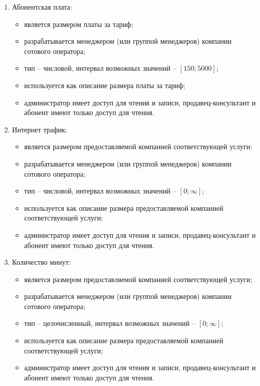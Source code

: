 \begin{enumerate}
\begin{enumerate}
        \item Абонентская плата:
        \begin{itemize}
            \item является размером платы за тариф;
            \item разрабатывается менеджером (или группой менеджеров) компании сотового оператора;
            \item тип -- числовой, интервал возможных значений -- $[150; 5000]$;
            \item используется как описание размера платы за тариф;
            \item администратор имеет доступ для чтения и записи, продавец-консультант и абонент имеют только доступ для чтения.
        \end{itemize}

        \item Интернет трафик:
        \begin{itemize}
            \item является размером предоставляемой компанией соответствующей услуги;
            \item разрабатывается менеджером (или группой менеджеров) компании сотового оператора;
            \item тип -- числовой, интервал возможных значений -- $[0; \infty]$; %
            \item используется как описание размера предоставляемой компанией соответствующей услуги;
            \item администратор имеет доступ для чтения и записи, продавец-консультант и абонент имеют только доступ для чтения.
        \end{itemize}

        \item Количество минут:
        \begin{itemize}
            \item является размером предоставляемой компанией соответствующей услуги;
            \item разрабатывается менеджером (или группой менеджеров) компании сотового оператора;
            \item тип -- целочисленный, интервал возможных значений -- $[0; \infty]$; %
            \item используется как описание размера предоставляемой компанией соответствующей услуги;
            \item администратор имеет доступ для чтения и записи, продавец-консультант и абонент имеют только доступ для чтения.
        \end{itemize}


\end{enumerate}
\end{enumerate}
